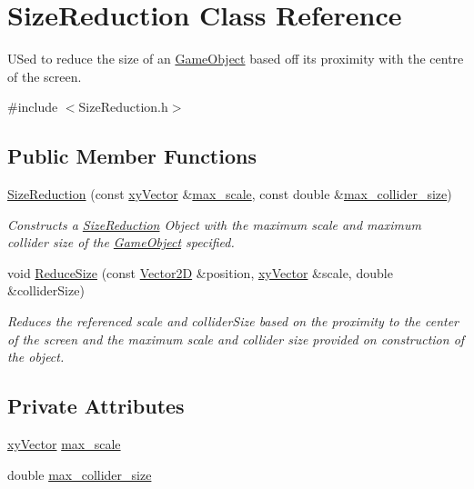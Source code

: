 \hypertarget{class_size_reduction}{}\section{Size\+Reduction Class Reference}
\label{class_size_reduction}


U\+Sed to reduce the size of an \hyperlink{class_game_object}{Game\+Object} based off its proximity with the centre of the screen.  




{\ttfamily \#include $<$Size\+Reduction.\+h$>$}

\subsection*{Public Member Functions}
\begin{DoxyCompactItemize}
\item 
\hyperlink{class_size_reduction_a2e274f3e867ac457d0fd354351426035}{Size\+Reduction} (const \hyperlink{structxy_vector}{xy\+Vector} \&\hyperlink{class_size_reduction_a99ace47c7794d51e539712a3c2bc8642}{max\+\_\+scale}, const double \&\hyperlink{class_size_reduction_aa58dd5c70892ea019a7e6c86e2027f8f}{max\+\_\+collider\+\_\+size})
\begin{DoxyCompactList}\small\item\em Constructs a \hyperlink{class_size_reduction}{Size\+Reduction} Object with the maximum scale and maximum collider size of the \hyperlink{class_game_object}{Game\+Object} specified. \end{DoxyCompactList}\item 
void \hyperlink{class_size_reduction_aee72365a4e351318fb49ae5c8c6da0f7}{Reduce\+Size} (const \hyperlink{class_vector2_d}{Vector2D} \&position, \hyperlink{structxy_vector}{xy\+Vector} \&scale, double \&collider\+Size)
\begin{DoxyCompactList}\small\item\em Reduces the referenced scale and collider\+Size based on the proximity to the center of the screen and the maximum scale and collider size provided on construction of the object. \end{DoxyCompactList}\end{DoxyCompactItemize}
\subsection*{Private Attributes}
\begin{DoxyCompactItemize}
\item 
\hyperlink{structxy_vector}{xy\+Vector} \hyperlink{class_size_reduction_a99ace47c7794d51e539712a3c2bc8642}{max\+\_\+scale}
\item 
double \hyperlink{class_size_reduction_aa58dd5c70892ea019a7e6c86e2027f8f}{max\+\_\+collider\+\_\+size}
\end{DoxyCompactItemize}


